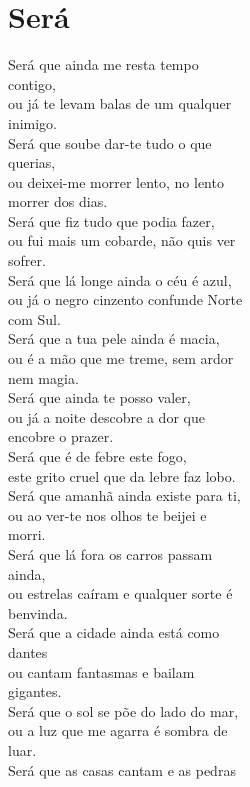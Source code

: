 \documentclass{article}
\begin{document}
\section{ Será}
Será que ainda me resta tempo\\
contigo,\\
ou já te levam balas de um qualquer\\
inimigo.\\
Será que soube dar-te tudo o que\\
querias,\\
ou deixei-me morrer lento, no lento\\
morrer dos dias.\\
Será que fiz tudo que podia fazer,\\
ou fui mais um cobarde, não quis ver\\
sofrer.\\
Será que lá longe ainda o céu é azul,\\
ou já o negro cinzento confunde Norte\\
com Sul.\\
Será que a tua pele ainda é macia,\\
ou é a mão que me treme, sem ardor\\
nem magia.\\
Será que ainda te posso valer,\\
ou já a noite descobre a dor que\\
encobre o prazer.\\
Será que é de febre este fogo,\\
este grito cruel que da lebre faz lobo.\\
Será que amanhã ainda existe para ti,\\
ou ao ver-te nos olhos te beijei e\\
morri.\\
Será que lá fora os carros passam\\
ainda,\\
ou estrelas caíram e qualquer sorte é\\
benvinda.\\
Será que a cidade ainda está como\\
dantes\\
ou cantam fantasmas e bailam\\
gigantes.\\
Será que o sol se põe do lado do mar,\\
ou a luz que me agarra é sombra de\\
luar.\\
Será que as casas cantam e as pedras\\
\end{document}
